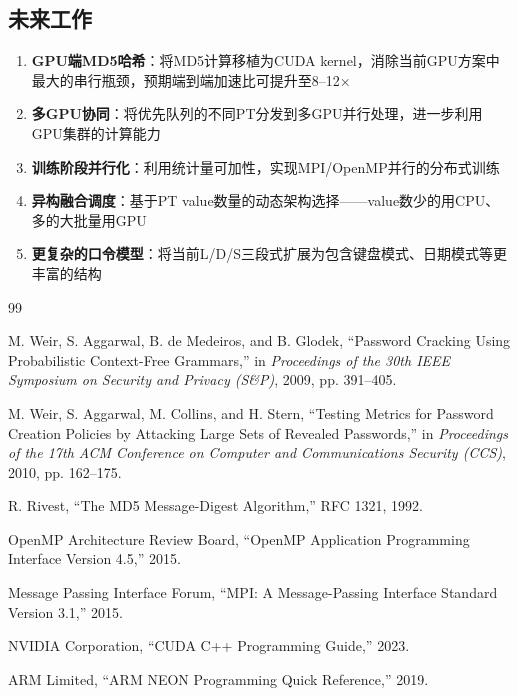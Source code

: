 \documentclass[12pt,a4paper]{ctexart}
\begin{document}
\subsection{未来工作}

\begin{enumerate}[nosep]
    \item \textbf{GPU端MD5哈希}：将MD5计算移植为CUDA kernel，消除当前GPU方案中最大的串行瓶颈，预期端到端加速比可提升至8--12×
    \item \textbf{多GPU协同}：将优先队列的不同PT分发到多GPU并行处理，进一步利用GPU集群的计算能力
    \item \textbf{训练阶段并行化}：利用统计量可加性，实现MPI/OpenMP并行的分布式训练
    \item \textbf{异构融合调度}：基于PT value数量的动态架构选择——value数少的用CPU、多的大批量用GPU
    \item \textbf{更复杂的口令模型}：将当前L/D/S三段式扩展为包含键盘模式、日期模式等更丰富的结构
\end{enumerate}

\begin{thebibliography}{99}

M. Weir, S. Aggarwal, B. de Medeiros, and B. Glodek,
``Password Cracking Using Probabilistic Context-Free Grammars,''
in \textit{Proceedings of the 30th IEEE Symposium on Security and Privacy (S\&P)}, 2009, pp. 391--405.

M. Weir, S. Aggarwal, M. Collins, and H. Stern,
``Testing Metrics for Password Creation Policies by Attacking Large Sets of Revealed Passwords,''
in \textit{Proceedings of the 17th ACM Conference on Computer and Communications Security (CCS)}, 2010, pp. 162--175.

R. Rivest, ``The MD5 Message-Digest Algorithm,'' RFC 1321, 1992.

OpenMP Architecture Review Board, ``OpenMP Application Programming Interface Version 4.5,'' 2015.

Message Passing Interface Forum, ``MPI: A Message-Passing Interface Standard Version 3.1,'' 2015.

NVIDIA Corporation, ``CUDA C++ Programming Guide,'' 2023.

ARM Limited, ``ARM NEON Programming Quick Reference,'' 2019.

\end{thebibliography}
\end{document}
